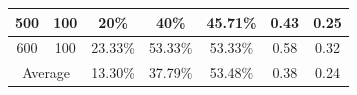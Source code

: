 \documentclass{sig-alternate}
\begin{document}
\begin{table}[]
\begin{tabular}{@{}|c|c|c|c|c|c|c|@{}}
500                                                                               & 100                                                                      & 20\%                                                 & 40\%                                                 & 45.71\%                                                  &  0.43   & 0.25     \\ \midrule
600
&
100
&23.33\% &
53.33\% &
53.33\% & 0.58 &
0.32     \\  \midrule

\multicolumn{2}{|c|}{Average}                                                                                                                                & 13.30\%                                                 & 37.79\%                                                 & 53.48\%                                                  &   0.38  &  0.24    \\ \bottomrule

\end{tabular}
\end{table}
\end{document}
